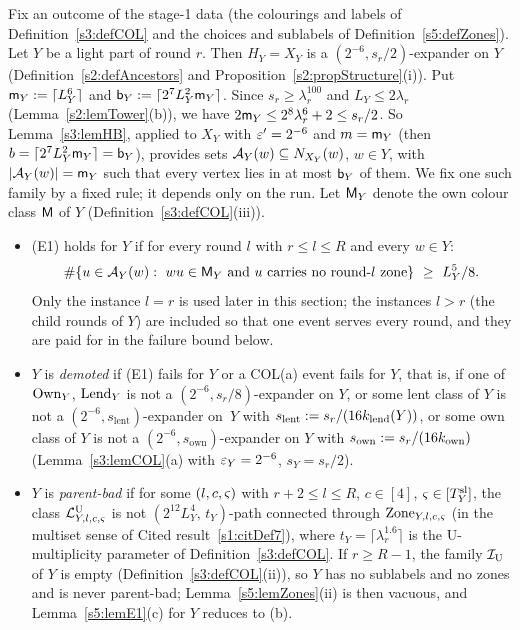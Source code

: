 \begin{definition}\label{s5:defStages}
Fix an outcome of the stage-1 data (the colourings and labels of Definition~\ref{s3:defCOL} and the choices and sublabels of Definition~\ref{s5:defZones}). Let $Y$ be a light part of round $r$. Then $H_Y=X_Y$ is a $(2^{-6},s_r/2)$-expander on $Y$ (Definition~\ref{s2:defAncestors} and Proposition~\ref{s2:propStructure}(i)). Put $\mathsf{m}_Y\mathrel{:=}\lceil L_Y^6\rceil$ and $\mathsf{b}_Y\mathrel{:=}\lceil 2^7L_Y^2\mathsf{m}_Y\rceil$. Since $s_r\ge\lambda_r^{100}$ and $L_Y\le 2\lambda_r$ (Lemma~\ref{s2:lemTower}(b)), we have $2\mathsf{m}_Y\le 2^8\lambda_r^6+2\le s_r/2$. So Lemma~\ref{s3:lemHB}, applied to $X_Y$ with $\varepsilon'=2^{-6}$ and $m=\mathsf{m}_Y$ (then $b=\lceil 2^7L_Y^2\mathsf{m}_Y\rceil=\mathsf{b}_Y$), provides sets $\mathcal{A}_Y(w)\subseteq N_{X_Y}(w)$, $w\in Y$, with $|\mathcal{A}_Y(w)|=\mathsf{m}_Y$ such that every vertex lies in at most $\mathsf{b}_Y$ of them. We fix one such family by a fixed rule; it depends only on the run. Let $\mathsf{M}_Y$ denote the own colour class $\mathsf{M}$ of $Y$ (Definition~\ref{s3:defCOL}(iii)).
\begin{itemize}
\item \textup{(E1)} holds for $Y$ if for every round $l$ with $r\le l\le R$ and every $w\in Y$:
\[
\#\{u\in\mathcal{A}_Y(w):\ wu\in\mathsf{M}_Y\ \text{and $u$ carries no round-$l$ zone}\}\ \ge\ L_Y^5/8 .
\]
Only the instance $l=r$ is used later in this section; the instances $l>r$ (the child rounds of $Y$) are included so that one event serves every round, and they are paid for in the failure bound below.
\item $Y$ is \emph{demoted} if (E1) fails for $Y$ or a COL(a) event fails for $Y$, that is, if one of $\mathrm{Own}_Y$, $\mathrm{Lend}_Y$ is not a $(2^{-6},s_r/8)$-expander on $Y$, or some lent class of $Y$ is not a $(2^{-6},s_{\mathrm{lent}})$-expander on~$Y$ with $s_{\mathrm{lent}}\mathrel{:=} s_r/(16k_{\mathrm{lend}}(Y))$, or some own class of $Y$ is not a $(2^{-6},s_{\mathrm{own}})$-expander on $Y$ with $s_{\mathrm{own}}\mathrel{:=} s_r/(16k_{\mathrm{own}})$ (Lemma~\ref{s3:lemCOL}(a) with $\varepsilon_Y=2^{-6}$, $s_Y=s_r/2$).
\item $Y$ is \emph{parent-bad} if for some $(l,c,\varsigma)$ with $r+2\le l\le R$, $c\in[4]$, $\varsigma\in[T^{\mathrm{sl}}_Y]$, the class $\mathcal{L}^{\mathrm{U}}_{Y,l,c,\varsigma}$ is not $(2^{12}L_Y^4,\,t_Y)$-path connected through $\mathrm{Zone}_{Y,l,c,\varsigma}$ (in the multiset sense of Cited result~\ref{s1:citDef7}), where $t_Y=\lceil\lambda_r^{1.6}\rceil$ is the U-multiplicity parameter of Definition~\ref{s3:defCOL}. If $r\ge R-1$, the family $\mathcal{I}_{\mathrm{U}}$ of $Y$ is empty (Definition~\ref{s3:defCOL}(ii)), so $Y$ has no sublabels and no zones and is never parent-bad; Lemma~\ref{s5:lemZones}(ii) is then vacuous, and Lemma~\ref{s5:lemE1}(c) for $Y$ reduces to (b).

\end{itemize}
\end{definition}
